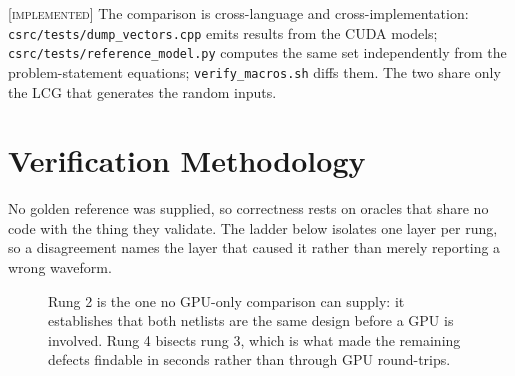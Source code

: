\documentclass[11pt]{article}
\newcommand{\I}{\textcolor{note}{\scriptsize\textsc{[implemented]}}}
\newcommand{\code}[1]{\texttt{\small #1}}
\begin{document}
\I{} The comparison is cross-language and cross-implementation:
\code{csrc/tests/dump\_vectors.cpp} emits results from the CUDA models;
\code{csrc/tests/reference\_model.py} computes the same set independently from the
problem-statement equations; \code{verify\_macros.sh} diffs them. The two share only
the LCG that generates the random inputs.

\section{Verification Methodology}\label{sec:verif}

No golden reference was supplied, so correctness rests on oracles that share no code
with the thing they validate. The ladder below isolates one layer per rung, so a
disagreement names the layer that caused it rather than merely reporting a wrong
waveform.

\begin{figure}[h]\centering
{}
\caption{Rung 2 is the one no GPU-only comparison can supply: it establishes that both
netlists are the same design before a GPU is involved. Rung 4 bisects rung 3, which
is what made the remaining defects findable in seconds rather than through GPU
round-trips.}
\label{fig:ladder}
\end{figure}
\end{document}
